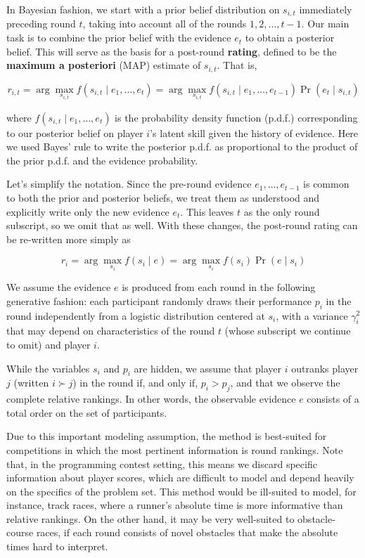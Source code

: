 \documentclass{article}
\begin{document}
In Bayesian fashion, we start with a prior belief distribution on $s_{i,t}$ immediately preceding round $t$, taking into account all of the rounds $1,2,\ldots,t-1$. Our main task is to combine the prior belief with the evidence $e_t$ to obtain a posterior belief. This will serve as the basis for a post-round \textbf{rating}, defined to be the \textbf{maximum a posteriori} (MAP) estimate of $s_{i,t}$. That is,

\[r_{i,t} = \arg\max_{s_{i,t}} f(s_{i,t} \mid e_1,\ldots,e_t)
= \arg\max_{s_{i,t}} f(s_{i,t} \mid e_1,\ldots,e_{t-1}) \Pr(e_t \mid s_{i,t})\]

where $f(s_{i,t} \mid e_1,\ldots,e_t)$ is the probability density function (p.d.f.) corresponding to our posterior belief on player $i$'s latent skill given the history of evidence. Here we used Bayes' rule to write the posterior p.d.f. as proportional to the product of the prior p.d.f. and the evidence probability.

Let's simplify the notation. Since the pre-round evidence $e_1,\ldots,e_{t-1}$ is common to both the prior and posterior beliefs, we treat them as understood and explicitly write only the new evidence $e_t$. This leaves $t$ as the only round subscript, so we omit that as well. With these changes, the post-round rating can be re-written more simply as

\[r_i = \arg\max_{s_i} f(s_i \mid e) = \arg\max_{s_i} f(s_i) \Pr(e \mid s_i)\]

We assume the evidence $e$ is produced from each round in the following generative fashion: each participant randomly draws their performance $p_i$ in the round independently from a logistic distribution centered at $s_i$, with a variance $\gamma_i^2$ that may depend on characteristics of the round $t$ (whose subscript we continue to omit) and player $i$.

While the variables $s_i$ and $p_i$ are hidden, we assume that player $i$ outranks player $j$ (written $i \succ j$) in the round if, and only if, $p_i > p_j$, and that we observe the complete relative rankings. In other words, the observable evidence $e$ consists of a total order on the set of participants.

Due to this important modeling assumption, the method is best-suited for competitions in which the most pertinent information is round rankings. Note that, in the programming contest setting, this means we discard specific information about player scores, which are difficult to model and depend heavily on the specifics of the problem set. This method would be ill-suited to model, for instance, track races, where a runner's absolute time is more informative than relative rankings. On the other hand, it may be very well-suited to obstacle-course races, if each round consists of novel obstacles that make the absolute times hard to interpret.
\end{document}
